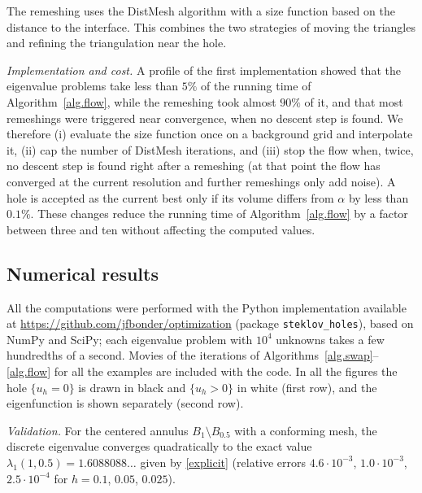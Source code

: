 \documentclass[11pt]{amsart}
\theoremstyle{remark}
\numberwithin{equation}{section}
\begin{document}
The remeshing uses the DistMesh algorithm \cite{PS} with a size function based on the distance to the interface. This combines the two strategies of moving the triangles and refining the triangulation near the hole.

\emph{Implementation and cost.} A profile of the first implementation showed that the eigenvalue problems take less than $5\%$ of the running time of Algorithm~\ref{alg.flow}, while the remeshing took almost $90\%$ of it, and that most remeshings were triggered near convergence, when no descent step is found. We therefore (i) evaluate the size function once on a background grid and interpolate it, (ii) cap the number of DistMesh iterations, and (iii) stop the flow when, twice, no descent step is found right after a remeshing (at that point the flow has converged at the current resolution and further remeshings only add noise). A hole is accepted as the current best only if its volume differs from $\alpha$ by less than $0.1\%$. These changes reduce the running time of Algorithm~\ref{alg.flow} by a factor between three and ten without affecting the computed values.

\subsection{Numerical results}\label{sec.results}
All the computations were performed with the Python implementation available at \url{https://github.com/jfbonder/optimization} (package \texttt{steklov\_holes}), based on NumPy and SciPy; each eigenvalue problem with $10^4$ unknowns takes a few hundredths of a second. Movies of the iterations of Algorithms~\ref{alg.swap}--\ref{alg.flow} for all the examples are included with the code. In all the figures the hole $\{u_h=0\}$ is drawn in black and $\{u_h>0\}$ in white (first row), and the eigenfunction is shown separately (second row).

\emph{Validation.} For the centered annulus $B_1\setminus B_{0.5}$ with a conforming mesh, the discrete eigenvalue converges quadratically to the exact value $\lambda_1(1,0.5)=1.6088088\ldots$ given by \eqref{explicit} (relative errors $4.6\cdot10^{-3}$, $1.0\cdot10^{-3}$, $2.5\cdot10^{-4}$ for $h=0.1$, $0.05$, $0.025$).
\end{document}
